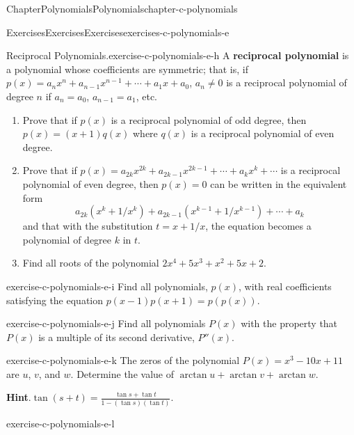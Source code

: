 \documentclass[oneside,10pt,]{book}
\newcommand{\blocktitlefont}{\relax}
\newcommand{\terminology}[1]{\textbf{#1}}
\numberwithin{equation}{section}
\begin{document}
\begin{chapterptx}{Chapter}{Polynomials}{}{Polynomials}{}{}{chapter-c-polynomials}
\begin{exercises-section}{Exercises}{Exercises}{}{Exercises}{}{}{exercises-c-polynomials-e}
\begin{divisionexercise}{7}{Reciprocal Polynomials.}{}{exercise-c-polynomials-e-h}%
%
A \terminology{reciprocal polynomial} is a polynomial whose coefficients are symmetric; that is, if \(p(x) = a_n x^n + a_{n-1}x^{n-1}+ \cdots +a_1 x + a_0\), \(a_n \neq 0\) is a reciprocal polynomial of degree \(n\) if \(a_n = a_0\), \(a_{n-1} = a_1\), etc.%
\begin{enumerate}[label=(\alph*)]
\item{}Prove that if \(p(x)\) is a reciprocal polynomial of odd degree, then \(p(x) = (x+1)q(x)\) where \(q(x) \) is a reciprocal polynomial of even degree.%
\item{}Prove that if \(p(x) = a_{2k} x^{2k} + a_{2k-1}x^{2k-1}+ \cdots +a_{k} x^k + \cdots\) is a reciprocal polynomial of even degree, then \(p(x)= 0\) can be written in the equivalent form%
\begin{equation*}
a_{2k} (x^k+1/x^k) + a_{2k-1} (x^{k-1}+1/x^{k-1}) + \cdots +a_{k} 
\end{equation*}
and that with the substitution \(t=x+1/x\), the equation becomes a polynomial of degree \(k\) in \(t\).%
\item{}Find all roots of the polynomial \(2 x^4 + 5 x^3 + x^2 + 5 x + 2\).%
\end{enumerate}
%
\end{divisionexercise}%
\begin{divisionexercise}{8}{}{}{exercise-c-polynomials-e-i}%
Find all polynomials, \(p(x)\), with real coefficients satisfying the equation \(p(x-1)p(x+1) = p(p(x))\).%
\end{divisionexercise}%
\begin{divisionexercise}{9}{}{}{exercise-c-polynomials-e-j}%
Find all polynomials \(P(x)\) with the property that \(P(x)\) is a multiple of its second derivative, \(P''(x)\).%
\end{divisionexercise}%
\begin{divisionexercise}{10}{}{}{exercise-c-polynomials-e-k}%
The zeros of the polynomial \(P(x) = x^3 - 10x + 11\) are \(u\), \(v\), and \(w\). Determine the value of \(\arctan  u + \arctan v + \arctan  w\).%
\par\smallskip%
\noindent\textbf{\blocktitlefont Hint}.\hypertarget{hint-c-polynomials-e-k-b}{}\quad{}\(\tan(s+t)=\frac{\tan  s + \tan  t }{1-(\tan  s )(\tan  t)}\).%
\end{divisionexercise}%
\begin{divisionexercise}{11}{}{}{exercise-c-polynomials-e-l}%

\end{divisionexercise}
\end{exercises-section}
\end{chapterptx}
\end{document}
